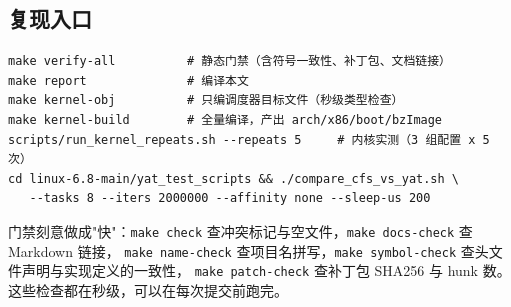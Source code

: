 \subsection{复现入口}

\begin{verbatim}
make verify-all          # 静态门禁（含符号一致性、补丁包、文档链接）
make report              # 编译本文
make kernel-obj          # 只编调度器目标文件（秒级类型检查）
make kernel-build        # 全量编译，产出 arch/x86/boot/bzImage
scripts/run_kernel_repeats.sh --repeats 5     # 内核实测（3 组配置 x 5 次）
cd linux-6.8-main/yat_test_scripts && ./compare_cfs_vs_yat.sh \
   --tasks 8 --iters 2000000 --affinity none --sleep-us 200
\end{verbatim}

门禁刻意做成"快"：\texttt{make check} 查冲突标记与空文件，\texttt{make docs-check} 查 Markdown 链接，
\texttt{make name-check} 查项目名拼写，\texttt{make symbol-check} 查头文件声明与实现定义的一致性，
\texttt{make patch-check} 查补丁包 SHA256 与 hunk 数。这些检查都在秒级，可以在每次提交前跑完。
